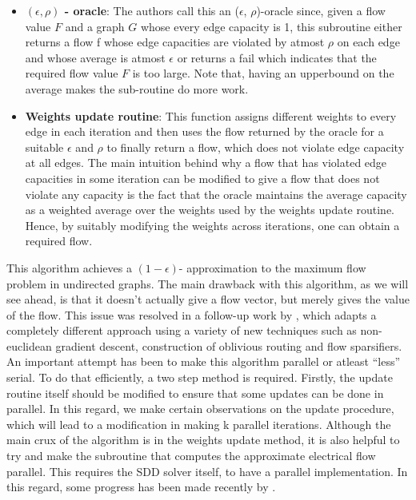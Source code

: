 \documentclass[BTech]{iitmdiss}
\begin{document}
	 \begin{itemize}
	  \item 
	    \textbf{$(\epsilon, \rho)$ - oracle}: The authors call this an ($\epsilon$, $\rho$)-oracle since, given a flow value $F$ and a graph $G$ whose every
	    edge capacity is 1, this subroutine either returns a flow f whose edge capacities are violated by atmost $\rho$ on each edge 
	    and whose average is atmost $\epsilon$ or returns a fail which indicates that the required flow value $F$ is too large. Note that, 
	    having an upperbound on the average makes the sub-routine do more work.
	  \item
	    \textbf{Weights update routine}: This function assigns different weights to every edge in each iteration and then uses the flow returned 
	    by the oracle for a suitable $\epsilon$ and $\rho$ to finally return a flow, which does not violate edge capacity at all edges. The main 
	    intuition behind why a flow that has violated edge capacities in some iteration can be modified to give a flow that does not violate 
	    any capacity is the fact that the oracle maintains the average capacity as a weighted average over the weights used by the weights
	    update routine. Hence, by suitably modifying the weights across iterations, one can obtain a required flow.
	 \end{itemize}

	  This algorithm achieves a $(1- \epsilon)$- approximation to the maximum flow problem in undirected graphs. The main drawback with this algorithm,
	  as we will see ahead, is that it doesn't actually give a flow vector, but merely gives the value of the flow. This issue was resolved 
	  in a follow-up work by \cite{DBLP:journals/corr/abs-1304-2338}, which adapts a completely different approach using a variety of new techniques
	  such as non-euclidean gradient descent, construction of oblivious routing and flow sparsifiers. \\
	  
	  An important attempt has been to make this algorithm parallel or atleast ``less'' serial. To do that efficiently, a two step method is 
	  required. Firstly, the update routine itself should be modified to ensure that some updates can be done in parallel. In this regard, we make
	  certain observations on the update procedure, which will lead to a modification in making k parallel iterations.
	  Although the main crux of the algorithm is in the weights update method, it is also helpful to try and make the subroutine that computes the
	  approximate electrical flow parallel. This requires the SDD solver itself, to have a parallel implementation. In this regard, some progress has
	  been made recently by \cite{DBLP:journals/corr/PengS13}. \\
	
\end{document}
